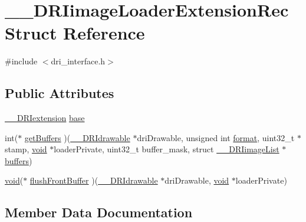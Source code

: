 \hypertarget{struct_____d_r_iimage_loader_extension_rec}{}\section{\+\_\+\+\_\+\+D\+R\+Iimage\+Loader\+Extension\+Rec Struct Reference}
\label{struct_____d_r_iimage_loader_extension_rec}


{\ttfamily \#include $<$dri\+\_\+interface.\+h$>$}

\subsection*{Public Attributes}
\begin{DoxyCompactItemize}
\item 
\hyperlink{dri__interface_8h_a4e0a61c8ece00d2b2c6792a9a1b55385}{\+\_\+\+\_\+\+D\+R\+Iextension} \hyperlink{struct_____d_r_iimage_loader_extension_rec_aaeebc3b568703fc170c8108519f6ef5b}{base}
\item 
int($\ast$ \hyperlink{struct_____d_r_iimage_loader_extension_rec_a854cbf79a37003f2ea34134f9ce64c6d}{get\+Buffers} )(\hyperlink{dri__interface_8h_a5bfb832a0a08208d95b3bbef439d2262}{\+\_\+\+\_\+\+D\+R\+Idrawable} $\ast$dri\+Drawable, unsigned int \hyperlink{gl_8h_a71a65ffd977afe9c3fef116a5bc9ee27}{format}, uint32\+\_\+t $\ast$stamp, \hyperlink{_s_d_l__opengles2__gl2ext_8h_ae5d8fa23ad07c48bb609509eae494c95}{void} $\ast$loader\+Private, uint32\+\_\+t buffer\+\_\+mask, struct \hyperlink{struct_____d_r_iimage_list}{\+\_\+\+\_\+\+D\+R\+Iimage\+List} $\ast$\hyperlink{glcorearb_8h_acaf3212fc88caa23745613e709a3e869}{buffers})
\item 
\hyperlink{_s_d_l__opengles2__gl2ext_8h_ae5d8fa23ad07c48bb609509eae494c95}{void}($\ast$ \hyperlink{struct_____d_r_iimage_loader_extension_rec_a76ae5c894a5d4f0f201b14166b9c6a34}{flush\+Front\+Buffer} )(\hyperlink{dri__interface_8h_a5bfb832a0a08208d95b3bbef439d2262}{\+\_\+\+\_\+\+D\+R\+Idrawable} $\ast$dri\+Drawable, \hyperlink{_s_d_l__opengles2__gl2ext_8h_ae5d8fa23ad07c48bb609509eae494c95}{void} $\ast$loader\+Private)
\end{DoxyCompactItemize}


\subsection{Member Data Documentation}
\mbox{\label{struct_____d_r_iimage_loader_extension_rec_aaeebc3b568703fc170c8108519f6ef5b}} 
